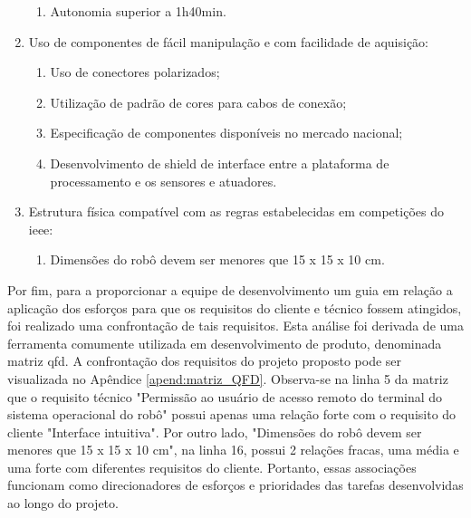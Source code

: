 \begin{enumerate}
\begin{enumerate}
		\item Autonomia superior a 1h40min.
	\end{enumerate}
	
	\item Uso de componentes de fácil manipulação e com facilidade de aquisição:
	\begin{enumerate}
		\item Uso de conectores polarizados;
		
		\item Utilização de padrão de cores para cabos de conexão;
		
		\item Especificação de componentes disponíveis no mercado nacional;
		
		\item Desenvolvimento de shield de interface entre a plataforma de processamento e os sensores e atuadores.
	\end{enumerate}
	
	\item Estrutura física compatível com as regras estabelecidas em competições do \gls*{ieee}:
	\begin{enumerate}
		\item Dimensões do robô devem ser menores que 15 x 15 x 10 cm.
	\end{enumerate}
\end{enumerate}

Por fim, para a proporcionar a equipe de desenvolvimento um guia em relação a aplicação dos esforços para que os requisitos do cliente e técnico fossem atingidos, foi realizado uma confrontação de tais requisitos. Esta análise foi derivada de uma ferramenta comumente utilizada em desenvolvimento de produto, denominada matriz \acrshort*{qfd}. A confrontação dos requisitos do projeto proposto pode ser visualizada no Apêndice \ref{apend:matriz_QFD}. Observa-se na linha 5 da matriz que o requisito técnico "Permissão ao usuário de acesso remoto do terminal do sistema operacional do robô" possui apenas uma relação forte com o requisito do cliente "Interface intuitiva". Por outro lado, "Dimensões do robô devem ser menores que 15 x 15 x 10 cm", na linha 16, possui 2 relações fracas, uma média e uma forte com diferentes requisitos do cliente. Portanto, essas associações funcionam como direcionadores de esforços e prioridades das tarefas desenvolvidas ao longo do projeto.

